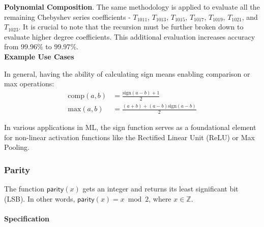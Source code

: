 \documentclass[article]{iacrtrans}
\begin{document}
\textbf{Polynomial Composition}. The same methodology is applied to evaluate all the remaining Chebyshev series coefficients - $T_{1011}$, $T_{1013}$, $T_{1015}$, $T_{1017}$, $T_{1019}$, $T_{1021}$, and $T_{1023}$. It is crucial to note that the recursion must be further broken down to evaluate higher degree coefficients. This additional evaluation increases accuracy from $99.96\%$ to $99.97\%$.\\

\textbf{Example Use Cases}

In general, having the ability of calculating sign means enabling comparison or max operations:
        \begin{align}
            \text{comp}(a,b) &= \frac{ \text{sign}(a-b)+1}{2}\\
            \text{max}(a,b) &= \frac{ (a+b)+(a-b) \text{sign}(a-b)}{2}
        \end{align}
        
In various applications in ML, the sign function serves as a foundational element for non-linear activation functions like the Rectified Linear Unit (ReLU) or Max Pooling. 




\subsubsection{Parity}
The function $\textsf{parity}(x)$ gets an integer and returns its least significant bit (LSB). In other words,
$\textsf{parity}(x)=x \bmod 2$, where $x \in \mathbb Z$.
 
\paragraph{Specification}
\end{document}
